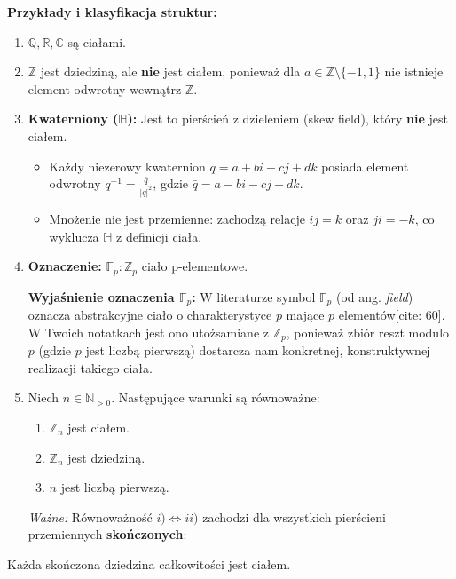 \noindent \textbf{Przykłady i klasyfikacja struktur:}
\begin{enumerate}[label=\arabic*)]
    \item $\mathbb{Q}, \mathbb{R}, \mathbb{C}$ są ciałami.
    \item $\mathbb{Z}$ jest dziedziną, ale \textbf{nie} jest ciałem, ponieważ dla $a \in \mathbb{Z} \setminus \{-1, 1\}$ nie istnieje element odwrotny wewnątrz $\mathbb{Z}$.
    
    \item \textbf{Kwaterniony ($\mathbb{H}$):} Jest to pierścień z dzieleniem (skew field), który \textbf{nie} jest ciałem. 
    \begin{itemize}
        \item Każdy niezerowy kwaternion $q = a + bi + cj + dk$ posiada element odwrotny $q^{-1} = \frac{\bar{q}}{|q|^2}$, gdzie $\bar{q} = a - bi - cj - dk$.
        \item Mnożenie nie jest przemienne: zachodzą relacje $ij = k$ oraz $ji = -k$, co wyklucza $\mathbb{H}$ z definicji ciała.
    \end{itemize}

    \item \noindent \textbf{Oznaczenie: } $\mathbb{F}_{p}: \mathbb{Z}_{p}$ ciało p-elementowe. 

	\textbf{Wyjaśnienie oznaczenia $\mathbb{F}_p$:} 
	W literaturze symbol $\mathbb{F}_p$ (od ang. \textit{field}) oznacza abstrakcyjne ciało o charakterystyce $p$ mające $p$ elementów[cite: 60]. W Twoich notatkach jest ono utożsamiane z $\mathbb{Z}_p$, ponieważ zbiór reszt modulo $p$ (gdzie $p$ jest liczbą pierwszą) dostarcza nam konkretnej, konstruktywnej realizacji takiego ciała.

    \item Niech $n \in \mathbb{N}_{>0}$. Następujące warunki są równoważne:
    \begin{enumerate}[label=\roman*)]
        \item $\mathbb{Z}_n$ jest ciałem.
        \item $\mathbb{Z}_n$ jest dziedziną.
        \item $n$ jest liczbą pierwszą.
    \end{enumerate}
    \textit{Ważne:} Równoważność $i) \iff ii)$ zachodzi dla wszystkich pierścieni przemiennych \textbf{skończonych}:
\end{enumerate}
\begin{theorem}
Każda skończona dziedzina całkowitości jest ciałem.
\end{theorem}

